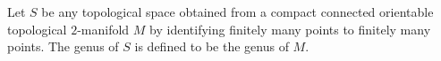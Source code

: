 Let $S$ be any topological space obtained from a compact connected orientable topological $2$-manifold $M$ by identifying finitely many points to finitely many points. The genus of $S$ is defined to be the genus of $M$.

